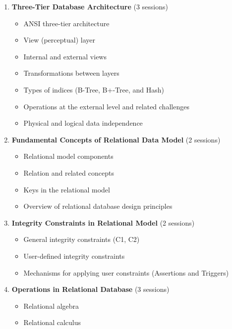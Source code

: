 \documentclass[12pt]{article}
\begin{document}
\begin{enumerate}
    \item \textbf{Three-Tier Database Architecture} (3 sessions)
        \begin{itemize}
            \item ANSI three-tier architecture
            \item View (perceptual) layer
            \item Internal and external views
            \item Transformations between layers
            \item Types of indices (B-Tree, B+-Tree, and Hash)
            \item Operations at the external level and related challenges
            \item Physical and logical data independence
        \end{itemize}
    
    \item \textbf{Fundamental Concepts of Relational Data Model} (2 sessions)
        \begin{itemize}
            \item Relational model components
            \item Relation and related concepts
            \item Keys in the relational model
            \item Overview of relational database design principles
        \end{itemize}

    \item \textbf{Integrity Constraints in Relational Model} (2 sessions)
        \begin{itemize}
            \item General integrity constraints (C1, C2)
            \item User-defined integrity constraints
            \item Mechanisms for applying user constraints (Assertions and Triggers)
        \end{itemize}

    \item \textbf{Operations in Relational Database} (3 sessions)
        \begin{itemize}
            \item Relational algebra
            \item Relational calculus
        \end{itemize}


\end{enumerate}
\end{document}
